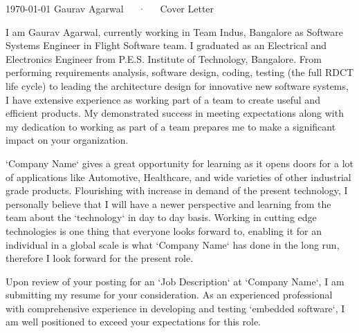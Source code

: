 \documentclass[11pt, a4paper]{awesome-cv}
\begin{document}
\makecvheader[R]

\makecvfooter
  {\today}
  {Gaurav Agarwal~~~·~~~Cover Letter}
  {}

\makelettertitle

\begin{cvletter}


I am Gaurav Agarwal, currently working in Team Indus, Bangalore as Software Systems Engineer in Flight Software team. I graduated
as an Electrical and Electronics Engineer from P.E.S. Institute of Technology, Bangalore. From performing requirements analysis,
software design, coding, testing (the full RDCT life cycle) to leading the architecture design for innovative new software systems, I
have extensive experience as working part of a team to create useful and efficient products. My demonstrated success in meeting
expectations along with my dedication to working as part of a team prepares me to make a significant impact on your organization.


`Company Name` gives a great opportunity for learning as it opens doors for a lot of applications like Automotive, Healthcare, and wide
varieties of other industrial grade products. Flourishing with increase in demand of the present technology, I personally believe that
I will have a newer perspective and learning from the team about the `technology` in day to day basis. Working in cutting edge
technologies is one thing that everyone looks forward to, enabling it for an individual in a global scale is what `Company Name` has
done in the long run, therefore I look forward for the present role.


Upon review of your posting for an `Job Description` at `Company Name`, I am submitting my resume for your consideration. As an experienced professional with comprehensive experience in developing and testing `embedded software`, I am well positioned to exceed your expectations for this role.

\end{cvletter}


\makeletterclosing
\end{document}
